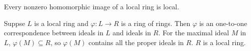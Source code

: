 $$ $$

\begin{ex}
    Every nonzero homomorphic image of a local ring is local.
\end{ex}

\begin{answer}
    Suppse $L$ is a local ring and $\varphi:L\to R$ is a ring of rings. Then $\varphi$ is an one-to-one correspondence between ideals in $L$ and ideals in $R$. For the maximal ideal $M$ in $L$, $\varphi(M)\subseteq R$, so $\varphi(M)$ contains all the proper ideals in $R$. $R$ is a local ring.
\end{answer}